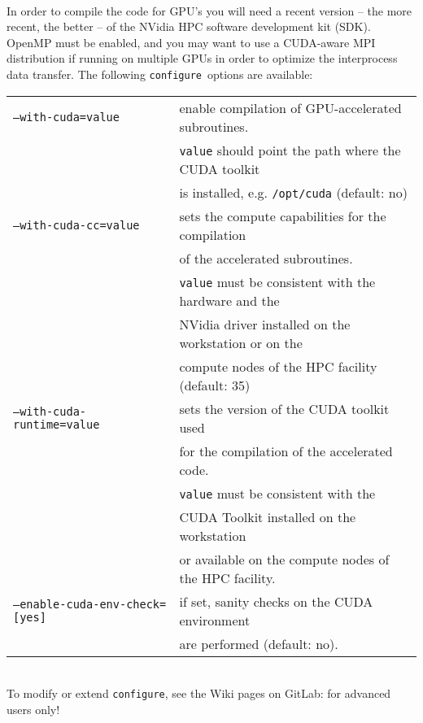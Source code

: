 \documentclass[12pt,a4paper]{article}
\def\configure{\texttt{configure}}
\begin{document}
\\
In order to compile the code for GPU's you will need a recent version
-- the more recent, the better -- of the NVidia HPC software development
kit (SDK). OpenMP must be enabled, and you may want to use a CUDA-aware MPI
distribution if running on multiple GPUs in order to optimize the
interprocess data transfer. The following \configure\ options are
available:\\
\begin{tabular}{ll}
\texttt{--with-cuda=value}&         enable compilation of GPU-accelerated subroutines.\\
                          &         \texttt{value} should point the path where the CUDA toolkit \\
                          &         is installed, e.g. \texttt{/opt/cuda} (default: no)\\
\texttt{--with-cuda-cc=value}&      sets the compute capabilities for the compilation\\
                             &      of the accelerated subroutines. \\
                             &      \texttt{value} must be consistent with the hardware and the\\
                             &      NVidia driver installed on the workstation or on the\\
                             &      compute nodes of the HPC facility (default: 35)\\
\texttt{--with-cuda-runtime=value}& sets the version of the CUDA toolkit used \\
                                  & for the compilation of the accelerated code.\\
                                  & \texttt{value} must be consistent with the\\
                                  & CUDA Toolkit installed on the workstation \\
                                  & or available on the compute nodes of the HPC facility.\\
\texttt{--enable-cuda-env-check=[yes]}& if set, sanity checks on the CUDA environment\\
                                      & are performed (default: no).
\end{tabular}\\


To modify or extend \configure, see the Wiki pages on GitLab:
for advanced users only!
\end{document}
